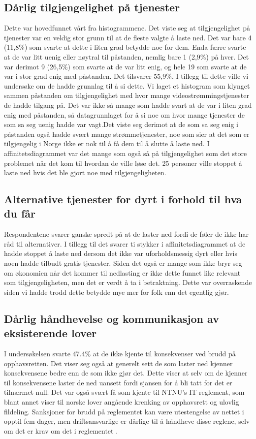 \subsection{Dårlig tilgjengelighet på tjenester}
Dette var hovedfunnet vårt fra histogrammene. Det viste seg at tilgjengelighet på tjenester var en veldig stor grunn til at de fleste valgte å laste ned. Det var bare 4 (11,8\%) som svarte at dette i liten grad betydde noe for dem. Enda færre svarte at de var litt uenig eller nøytral til påstanden, nemlig bare 1 (2,9\%) på hver. Det var derimot 9 (26,5\%) som svarte at de var litt enig, og hele 19 som svarte at de var i stor grad enig med påstanden. Det tilsvarer 55,9\%.
I tillegg til dette ville vi undersøke om de hadde grunnlag til å si dette. Vi laget et histogram som klynget sammen påstanden om tilgjengelighet med hvor mange videostrømmingstjenester de hadde tilgang på. Det var ikke så mange som hadde svart at de var i liten grad enig med påstanden, så datagrunnlaget for å si noe om hvor mange tjenester de som sa seg uenig hadde var vagt.Det viste seg derimot at de som sa seg enig i påstanden også hadde svært mange strømmetjenester, noe som sier at det som er tilgjengelig i Norge ikke er nok til å få dem til å slutte å laste ned. 
I affinitetsdiagrammet var det mange som også så på tilgjengelighet som det store problemet når det kom til hvordan de ville løse det. 25 personer ville stoppet å laste ned hvis det ble gjort noe med tilgjengeligheten. 

\subsection{Alternative tjenester for dyrt i forhold til hva du får}
Respondentene svarer ganske spredt på at de laster ned fordi de føler de ikke har råd til alternativer. I tillegg til det svarer ti stykker i affinitetsdiagrammet at de hadde stoppet å laste ned dersom det ikke var uforholdsmessig dyrt eller hvis noen hadde tilbudt gratis tjenester. Siden det også er mange som ikke bryr seg om økonomien når det kommer til nedlasting er ikke dette funnet like relevant som tilgjengeligheten, men det er verdt å ta i betraktning. Dette var overraskende siden vi hadde trodd dette betydde mye mer for folk enn det egentlig gjør. 

\subsection{Dårlig håndhevelse og kommunikasjon av eksisterende lover}
I undersøkelsen svarte 47.4\% at de ikke kjente til konsekvenser ved brudd på opphavsretten. Det viser seg også at generelt sett de som laster ned kjenner konsekvensene bedre enn de som ikke gjør det. Dette viser at selv om de kjenner til konsekvensene laster de ned uansett fordi sjansen for å bli tatt for det er tilnærmet null. Det var også svært få som kjente til NTNU's IT reglement, som blant annet viser til norske lover angående krenking av opphavsrett og ulovlig fildeling. Sanksjoner for brudd på reglementet kan være utestengelse av nettet i opptil fem dager, men driftsansvarlige er dårlige til å håndheve disse reglene, selv om det er krav om det i reglementet \cite{ITReg}. 